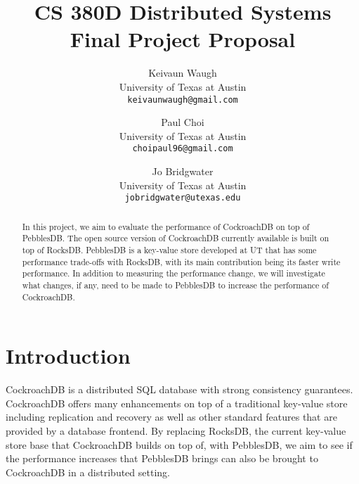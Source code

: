 \documentclass[10pt,twocolumn,letterpaper]{article}
\begin{document}
\title{CS 380D Distributed Systems Final Project Proposal}

\author{Keivaun Waugh\\
University of Texas at Austin\\
{\tt\small keivaunwaugh@gmail.com}
\and
Paul Choi\\
University of Texas at Austin\\
{\tt\small choipaul96@gmail.com}
\and
Jo Bridgwater\\
University of Texas at Austin\\
{\tt\small jobridgwater@utexas.edu}
}

\maketitle

\begin{abstract}
    In this project, we aim to evaluate the performance of CockroachDB on top of
    PebblesDB. The open source version of CockroachDB currently available is
    built on top of RocksDB. PebblesDB is a key-value store developed at UT
    that has some performance trade-offs with RocksDB, with its main
    contribution being its faster write performance. In addition to measuring
    the performance change, we will investigate what changes, if any, need to
    be made to PebblesDB to increase the performance of CockroachDB.
\end{abstract}

\section{Introduction}
CockroachDB is a distributed SQL database with strong consistency guarantees. CockroachDB offers many enhancements on top of a traditional key-value store including replication and recovery as well as other standard features that are provided by a database frontend. By replacing RocksDB, the current key-value store base that CockroachDB builds on top of, with PebblesDB, we aim to see if the performance increases that PebblesDB brings can also be brought to CockroachDB in a distributed setting.

\end{document}
